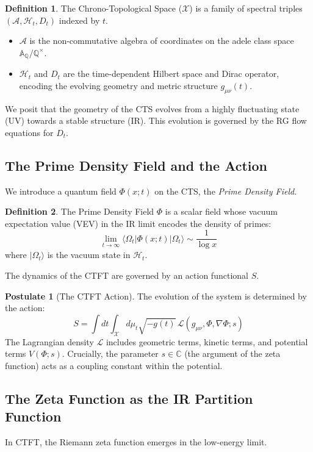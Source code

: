 \documentclass[11pt, a4paper]{article}
\theoremstyle{definition}
\newtheorem{definition}{Definition}[section]
\newtheorem{postulate}{Postulate}
\newcommand{\Q}{\mathbb{Q}}
\newcommand{\C}{\mathbb{C}}
\newcommand{\A}{\mathbb{A}}
\newcommand{\CTS}{\mathcal{X}}
\newcommand{\Lagr}{\mathcal{L}}
\newcommand{\Hilb}{\mathcal{H}}
\newcommand{\Alg}{\mathscr{A}}
\begin{document}
\begin{definition}
The Chrono-Topological Space ($\CTS$) is a family of spectral triples $(\Alg, \Hilb_t, D_t)$ indexed by $t$.
\begin{itemize}
    \item $\Alg$ is the non-commutative algebra of coordinates on the adele class space $\A_\Q/\Q^\times$.
    \item $\Hilb_t$ and $D_t$ are the time-dependent Hilbert space and Dirac operator, encoding the evolving geometry and metric structure $g_{\mu\nu}(t)$.
\end{itemize}
\end{definition}

We posit that the geometry of the CTS evolves from a highly fluctuating state (UV) towards a stable structure (IR). This evolution is governed by the RG flow equations for $D_t$.

\subsection{The Prime Density Field and the Action}
We introduce a quantum field $\Phi(x; t)$ on the CTS, the \textit{Prime Density Field}.

\begin{definition}
The Prime Density Field $\Phi$ is a scalar field whose vacuum expectation value (VEV) in the IR limit encodes the density of primes:
$$ \lim_{t\to\infty} \langle \Omega_t | \Phi(x; t) | \Omega_t \rangle \sim \frac{1}{\log x} $$
where $|\Omega_t\rangle$ is the vacuum state in $\Hilb_t$.
\end{definition}

The dynamics of the CTFT are governed by an action functional $S$.

\begin{postulate}[The CTFT Action]
The evolution of the system is determined by the action:
$$ S = \int dt \int_{\CTS} d\mu_t \sqrt{-g(t)} \, \Lagr(g_{\mu\nu}, \Phi, \nabla\Phi; s) $$
The Lagrangian density $\Lagr$ includes geometric terms, kinetic terms, and potential terms $V(\Phi; s)$. Crucially, the parameter $s \in \C$ (the argument of the zeta function) acts as a coupling constant within the potential.
\end{postulate}

\subsection{The Zeta Function as the IR Partition Function}
In CTFT, the Riemann zeta function emerges in the low-energy limit.
\end{document}
